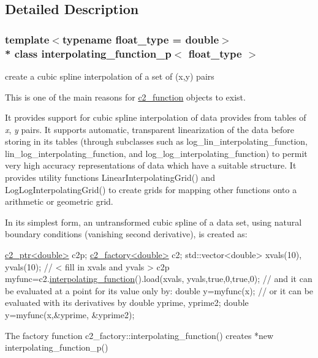 \subsection{Detailed Description}
\subsubsection*{template$<$typename float\+\_\+type = double$>$\\*
class interpolating\+\_\+function\+\_\+p$<$ float\+\_\+type $>$}

create a cubic spline interpolation of a set of (x,y) pairs

This is one of the main reasons for \hyperlink{classc2__function}{c2\+\_\+function} objects to exist. 

It provides support for cubic spline interpolation of data provides from tables of {\itshape x}, {\itshape y} pairs. It supports automatic, transparent linearization of the data before storing in its tables (through subclasses such as log\+\_\+lin\+\_\+interpolating\+\_\+function, lin\+\_\+log\+\_\+interpolating\+\_\+function, and log\+\_\+log\+\_\+interpolating\+\_\+function) to permit very high accuracy representations of data which have a suitable structure. It provides utility functions Linear\+Interpolating\+Grid() and Log\+Log\+Interpolating\+Grid() to create grids for mapping other functions onto a arithmetic or geometric grid.

In its simplest form, an untransformed cubic spline of a data set, using natural boundary conditions (vanishing second derivative), is created as\+: ~\newline

\begin{DoxyCode}
    \hyperlink{classc2__ptr}{c2\_ptr<double>} c2p;
    \hyperlink{classc2__factory}{c2\_factory<double>} c2;
std::vector<double> xvals(10), yvals(10); 
\textcolor{comment}{// < fill in xvals and yvals >}
c2p myfunc=c2.\hyperlink{classc2__factory_ab43eaad040801a28019b917c4195b8d5}{interpolating\_function}().load(xvals, yvals,\textcolor{keyword}{true},0,\textcolor{keyword}{true},0);
\textcolor{comment}{// and it can be evaluated at a point for its value only by: }
\textcolor{keywordtype}{double} y=myfunc(x); 
\textcolor{comment}{// or it can be evaluated with its derivatives by}
\textcolor{keywordtype}{double} yprime, yprime2; 
\textcolor{keywordtype}{double} y=myfunc(x,&yprime, &yprime2);
\end{DoxyCode}
 \begin{DoxyVerb}The factory function c2_factory::interpolating_function() creates *new interpolating_function_p()\end{DoxyVerb}
 

